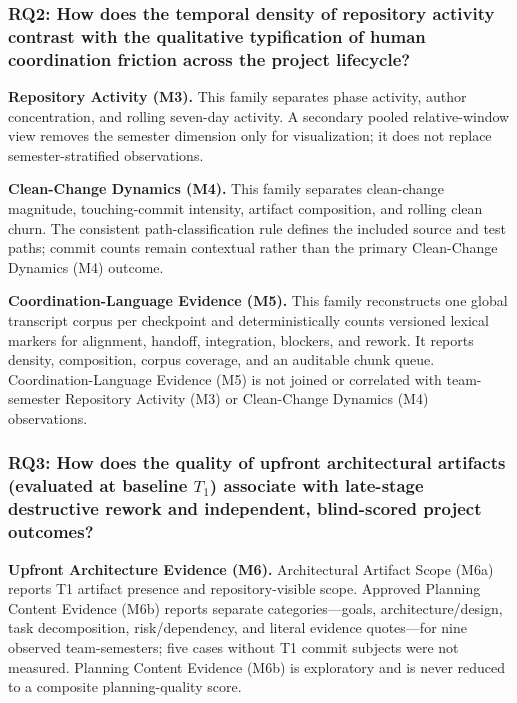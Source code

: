 \subsubsection{RQ2: How does the temporal density of repository activity contrast with the qualitative typification of human coordination friction across the project lifecycle?}

\textbf{Repository Activity (M3).} This family separates phase activity, author
concentration, and rolling seven-day activity. A secondary pooled relative-window
view removes the semester dimension only for visualization; it does not replace
semester-stratified observations.

\textbf{Clean-Change Dynamics (M4).} This family separates clean-change magnitude,
touching-commit intensity, artifact composition, and rolling clean churn. The
consistent path-classification rule defines the included source and test paths;
commit counts remain contextual rather than the primary Clean-Change Dynamics
(M4) outcome.

\textbf{Coordination-Language Evidence (M5).} This family reconstructs one global transcript
corpus per checkpoint and deterministically counts versioned lexical markers for
alignment, handoff, integration, blockers, and rework. It reports density,
composition, corpus coverage, and an auditable chunk queue.
Coordination-Language Evidence (M5) is not joined or correlated with
team-semester Repository Activity (M3) or Clean-Change Dynamics (M4)
observations.

\subsubsection{RQ3: How does the quality of upfront architectural artifacts (evaluated at baseline \texorpdfstring{$T_1$}{T1}) associate with late-stage destructive rework and independent, blind-scored project outcomes?}

\textbf{Upfront Architecture Evidence (M6).} Architectural Artifact Scope (M6a)
reports T1 artifact presence and repository-visible scope. Approved Planning
Content Evidence (M6b) reports separate categories---goals,
architecture/design, task decomposition,
risk/dependency, and literal evidence quotes---for nine observed team-semesters;
five cases without T1 commit subjects were not measured. Planning Content
Evidence (M6b) is exploratory
and is never reduced
to a composite planning-quality score.

